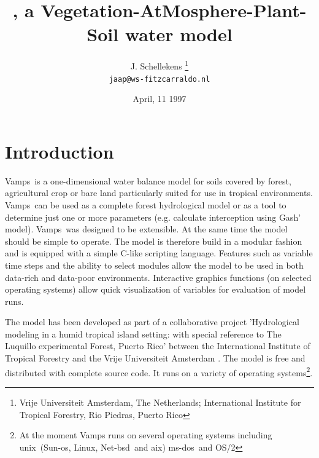 \documentclass[twocolumn]{article}
\title{\vamps, a Vegetation-AtMosphere-Plant-Soil water model}
\author{J. Schellekens
\thanks{Vrije Universiteit Amsterdam, The Netherlands; International
Institute for Tropical Forestry, Rio Piedras, Puerto Rico}\\ 
{\tt jaap@ws-fitzcarraldo.nl}}
\date{April, 11 1997}
\newcommand{\vamps}{{\sf Vamps}}
\newcommand{\unix}{{\sc unix}}
\newcommand{\linux}{Linux}
\newcommand{\netbsd}{Net-{\sc bsd}}
\newcommand{\msdos}{{\sc ms-dos}}
\newcommand{\ostwo} {{\sc OS/2}}
\newcommand{\aix}{{\sc aix}}
\newcommand{\sunos}{Sun-{\sc os}}
\begin{document}
\setlength{\parindent}{0pt}
\setlength{\parskip}{0.3cm}
\setlength{\textwidth}{1.2\textwidth}


\maketitle

\section*{Introduction}
\vamps\ is a one-dimensional water balance model for soils covered
by forest, agricultural crop or bare land particularly suited for use
in tropical environments.  \vamps\ can be used as a complete forest
hydrological model or as a tool to determine just one or more parameters
(e.g. calculate interception using Gash' model). \vamps\ was designed to
be extensible. At the same time the model should be simple to operate. The
model is therefore build in a modular fashion and is equipped with
a simple C-like scripting language.  Features such as  variable time
steps and the ability to select modules allow the model to be used in
both data-rich and data-poor environments. Interactive graphics functions
(on selected operating systems) allow quick visualization of variables
for evaluation of model runs.

The model has been developed as part of a collaborative project
'Hydrological modeling in a humid tropical island setting: with
special reference to The Luquillo experimental Forest, Puerto Rico'
between the International Institute of Tropical Forestry and the Vrije
Universiteit Amsterdam \cite{bruijnzeel1994}.  The model is free and
distributed with complete source code. It runs on a variety of operating
systems\footnote{At the moment \vamps{} runs on several operating
systems including \unix\ (\sunos{}, \linux{}, \netbsd\ and \aix{})
\msdos\ and \ostwo{}}.
\end{document}
